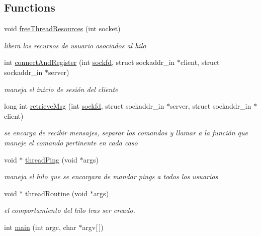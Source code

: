 \subsection*{Functions}
\begin{DoxyCompactItemize}
\item 
void \hyperlink{_g-2301-05-_p1-server_8c_a492f3eb1b5fd2db5f809828bcaeb8759}{free\-Thread\-Resources} (int socket)
\begin{DoxyCompactList}\small\item\em libera los recursos de usuario asociados al hilo \end{DoxyCompactList}\item 
int \hyperlink{_g-2301-05-_p1-server_8c_ab7b31b719e6de8a7c05105d5e78e4ede}{connect\-And\-Register} (int \hyperlink{_g-2301-05-_p2-user_tools_8h_ad2c8fb3df3a737e0685e902870a611d2}{sockfd}, struct sockaddr\-\_\-in $\ast$client, struct sockaddr\-\_\-in $\ast$server)
\begin{DoxyCompactList}\small\item\em maneja el inicio de sesión del cliente \end{DoxyCompactList}\item 
long int \hyperlink{_g-2301-05-_p1-server_8c_ae14d3432467a785bafce07c4ce2db219}{retrieve\-Msg} (int \hyperlink{_g-2301-05-_p2-user_tools_8h_ad2c8fb3df3a737e0685e902870a611d2}{sockfd}, struct sockaddr\-\_\-in $\ast$server, struct sockaddr\-\_\-in $\ast$client)
\begin{DoxyCompactList}\small\item\em se encarga de recibir mensajes, separar los comandos y llamar a la función que maneje el comando pertinente en cada caso \end{DoxyCompactList}\item 
void $\ast$ \hyperlink{_g-2301-05-_p1-server_8c_af073aef8b7cf446e542c8ef5002b27bc}{thread\-Ping} (void $\ast$args)
\begin{DoxyCompactList}\small\item\em maneja el hilo que se encargara de mandar pings a todos los usuarios \end{DoxyCompactList}\item 
void $\ast$ \hyperlink{_g-2301-05-_p1-server_8c_ac4e891ecfd0442a988ac4b2e1b88b796}{thread\-Routine} (void $\ast$args)
\begin{DoxyCompactList}\small\item\em el comportamiento del hilo tras ser creado. \end{DoxyCompactList}\item 
int \hyperlink{_g-2301-05-_p1-server_8c_a0ddf1224851353fc92bfbff6f499fa97}{main} (int argc, char $\ast$argv\mbox{[}$\,$\mbox{]})
\end{DoxyCompactItemize}
